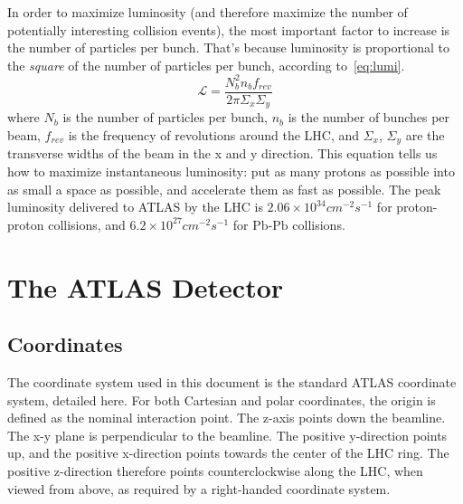 In order to maximize luminosity (and therefore maximize the number of potentially interesting collision events), the most important factor to increase is the number of particles per bunch.
That's because luminosity is proportional to the \textit{square} of the number of particles per bunch, according to~\ref{eq:lumi}.
\begin{equation}\label{eq:lumi}
\mathcal{L} = \frac{N_b^2 n_b f_{rev}}{2\pi \Sigma_x \Sigma_y}
\end{equation}
where $N_b$ is the number of particles per bunch, $n_b$ is the number of bunches per beam, $f_{rev}$ is the frequency of revolutions around the LHC, and $\Sigma_x$, $\Sigma_y$ are the transverse widths of the beam in the x and y direction.
This equation tells us how to maximize instantaneous luminosity: put as many protons as possible into as small a space as possible, and accelerate them as fast as possible.
The peak luminosity delivered to ATLAS by the LHC is $2.06\times10^{34}cm^{-2}s^{-1}$ for proton-proton collisions, and $6.2\times10^{27}cm^{-2}s^{-1}$ for $\mathrm{Pb}$-$\mathrm{Pb}$ collisions.

\section{The ATLAS Detector}\label{sec:atlas_detector}
\subsection{Coordinates}\label{subsec:coordinates}
The coordinate system used in this document is the standard ATLAS coordinate system, detailed here.
For both Cartesian and polar coordinates, the origin is defined as the nominal interaction point.
The z-axis points down the beamline.
The x-y plane is perpendicular to the beamline.
The positive y-direction points up, and the positive x-direction points towards the center of the LHC ring.
The positive z-direction therefore points counterclockwise along the LHC, when viewed from above, as required by a right-handed coordinate system.

